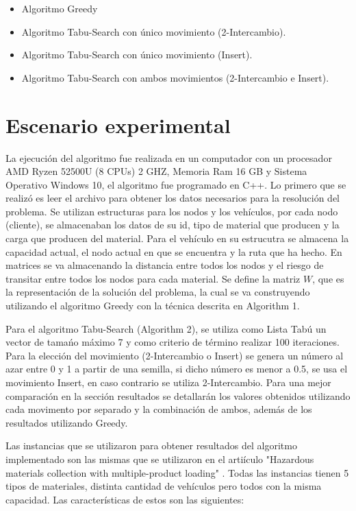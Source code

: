 \documentclass[conference]{IEEEtran}
\begin{document}
\begin{itemize}
    \item Algoritmo Greedy
    \item Algoritmo Tabu-Search con \'unico movimiento (2-Intercambio).
    \item Algoritmo Tabu-Search con \'unico movimiento (Insert).
    \item Algoritmo Tabu-Search con ambos movimientos (2-Intercambio e Insert).
\end{itemize}



\section{Escenario experimental}

La ejecuci\'on del algoritmo fue realizada en un computador con un procesador AMD Ryzen 52500U (8 CPUs) 2 GHZ, Memoria Ram 16 GB y Sistema Operativo Windows 10, el algoritmo fue programado en C++. Lo primero que se realiz\'o es leer el archivo para obtener los datos necesarios para la resoluci\'on del problema. Se utilizan estructuras para los nodos y los veh\'iculos, por cada nodo (cliente), se almacenaban los datos de su id, tipo de material que producen y la carga que producen del material. Para el veh\'iculo en su estrucutra se almacena la capacidad actual, el nodo actual en que se encuentra y la ruta que ha hecho. En matrices se va almacenando la distancia entre todos los nodos y el riesgo de transitar entre todos los nodos para cada material. Se define la matriz $W$, que es la representaci\'on de la soluci\'on del problema, la cual se va construyendo utilizando el algoritmo Greedy con la t\'ecnica descrita en Algorithm 1. 

Para el algoritmo Tabu-Search (Algorithm 2), se utiliza como Lista Tab\'u un vector de tama\'no m\'aximo 7 y como criterio de t\'ermino realizar 100 iteraciones. Para la elecci\'on del movimiento (2-Intercambio o Insert) se genera un n\'umero al azar entre 0 y 1 a partir de  una semilla, si dicho n\'umero es menor a 0.5, se usa el movimiento Insert, en caso contrario se utiliza 2-Intercambio. Para una mejor comparaci\'on en la secci\'on resultados se detallar\'an los valores obtenidos utilizando cada movimento por separado y la combinaci\'on de ambos, adem\'as de los resultados utilizando Greedy.

Las instancias que se utilizaron para obtener resultados del algoritmo implementado son las mismas que se utilizaron en el arti\'iculo "Hazardous    materials    collection with multiple-product  loading" \cite{b2}. Todas las instancias tienen 5 tipos de materiales, distinta cantidad de veh\'iculos pero todos con la misma capacidad.  Las caracter\'isticas de estos son las siguientes:
\end{document}
